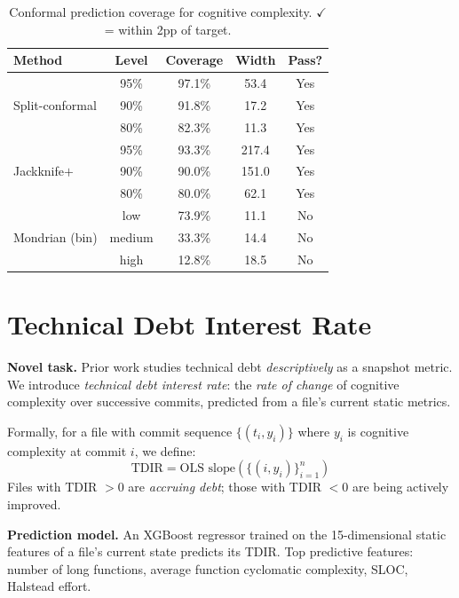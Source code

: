 \documentclass[conference]{IEEEtran}
\begin{document}
\begin{table}[t]
\caption{Conformal prediction coverage for cognitive complexity.
         $\checkmark$ = within 2pp of target.}
\label{tab:conformal}
\centering
\begin{tabular}{lcccc}
\toprule
Method & Level & Coverage & Width & Pass? \\
\midrule
\multirow{3}{*}{Split-conformal} & 95\% & 97.1\% & 53.4 & Yes \\
 & 90\% & 91.8\% & 17.2 & Yes \\
 & 80\% & 82.3\% & 11.3 & Yes \\
\midrule
\multirow{3}{*}{Jackknife$+$} & 95\% & 93.3\% & 217.4 & Yes \\
 & 90\% & 90.0\% & 151.0 & Yes \\
 & 80\% & 80.0\% & 62.1 & Yes \\
\midrule
\multirow{3}{*}{Mondrian (bin)} & low & 73.9\% & 11.1 & No \\
 & medium & 33.3\% & 14.4 & No \\
 & high & 12.8\% & 18.5 & No \\
\bottomrule
\end{tabular}
\end{table}

\section{Technical Debt Interest Rate}
\label{sec:tdinterest}

\textbf{Novel task.}
Prior work \cite{zazworka2011,kruchten2012} studies technical debt
\emph{descriptively} as a snapshot metric.
We introduce \emph{technical debt interest rate}: the \emph{rate of change}
of cognitive complexity over successive commits, predicted from a
file's current static metrics.

Formally, for a file with commit sequence $\{(t_i, y_i)\}$ where
$y_i$ is cognitive complexity at commit $i$, we define:
\[
  \text{TDIR} = \text{OLS slope}\left(\{(i, y_i)\}_{i=1}^{n}\right)
\]
Files with TDIR $> 0$ are \emph{accruing debt}; those with TDIR $< 0$
are being actively improved.

\textbf{Prediction model.}
An XGBoost regressor trained on the 15-dimensional static features of a
file's current state predicts its TDIR.
Top predictive features: number of long functions, average function
cyclomatic complexity, SLOC, Halstead effort.
\end{document}
